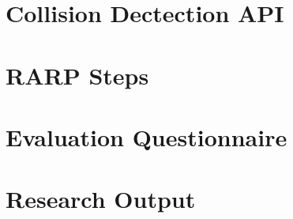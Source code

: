 
\appendix%



\chapter{Collision Dectection API}\label{apn:collision_detection_api}

\chapter{RARP Steps}\label{apn:rarp_steps}

\chapter{Evaluation Questionnaire}\label{apn:evaluation_questionnaire}


%

%

%
%

\chapter{Research Output}\label{apn:research_output}
